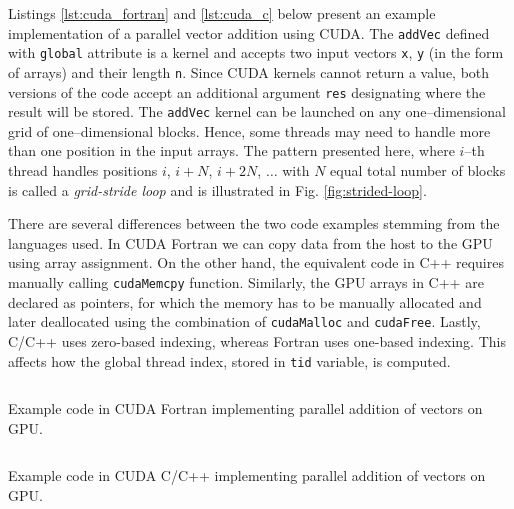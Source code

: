 \begin{example}
  Listings \ref{lst:cuda_fortran} and \ref{lst:cuda_c} below present an example
  implementation of a parallel vector addition using CUDA. The \texttt{addVec}
  defined with \texttt{global} attribute is a kernel and accepts two input
  vectors \texttt{x}, \texttt{y} (in the form of arrays) and their length
  \texttt{n}. Since CUDA kernels cannot return a value, both versions of the code
  accept an additional argument \texttt{res} designating where the result will be
  stored. The \texttt{addVec} kernel can be launched on any one--dimensional grid
  of one--dimensional blocks. Hence, some threads may need to handle more than
  one position in the input arrays. The pattern presented here, where $i$--th
  thread handles positions $i$, $i+N$, $i+2N$, $\ldots$ with $N$ equal total
  number of blocks is called a \emph{grid-stride loop} and is illustrated in Fig.
  \ref{fig:strided-loop}.

  There are several differences between the two code examples stemming from the
  languages used. In CUDA Fortran we can copy data from the host to the GPU using
  array assignment. On the other hand, the equivalent code in C++ requires
  manually calling \texttt{cudaMemcpy} function. Similarly, the GPU arrays in C++
  are declared as pointers, for which the memory has to be manually allocated and
  later deallocated using the combination of \texttt{cudaMalloc} and
  \texttt{cudaFree}. Lastly, C/C++ uses zero-based indexing, whereas Fortran uses
  one-based indexing. This affects how the global thread index, stored in
  \texttt{tid} variable, is computed.

  \begin{listing}
    \inputminted{fortran}{code/cuda_fortran.cuf}
    \caption{Example code in CUDA Fortran implementing parallel addition of vectors on GPU.}
    \label{lst:cuda_fortran}
  \end{listing}

  \begin{listing}
    \inputminted[fontsize=\footnotesize]{cuda}{code/cuda_c.cu}
    \caption{Example code in CUDA C/C++ implementing parallel addition of vectors on GPU.}
    \label{lst:cuda_c}
  \end{listing}


\end{example}
